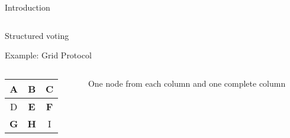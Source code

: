 \documentclass{beamer}
\newcommand{\voted}[1]{\textbf{\usebeamercolor[fg]{frametitle}#1}}
\begin{document}
\begin{frame}{Introduction}
\begin{columns}[t]
\begin{column}{.53\textwidth}
\begin{block}{Structured voting}
                \begin{exampleblock}{Example: Grid Protocol}
                    \medskip
                    \begin{columns}
                        \begin{column}{.2\textwidth}
                            \begin{tabular}{c | c | c}
                                A & \voted{B} & C \\
                                \hline
                                D & \voted{E} & \voted{F} \\
                                \hline
                                \voted{G} & \voted{H} & I \\
                            \end{tabular}
                        \end{column}
                        \begin{column}{.47\textwidth}
                            \small{One node from each column and one complete column}
                        \end{column}
                    \end{columns}
                \end{exampleblock}
            \end{block}
        \end{column}
    \end{columns}
\end{frame}
\end{document}

